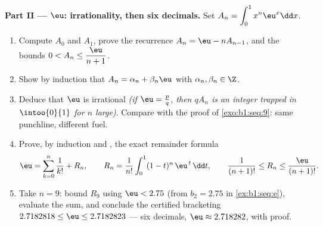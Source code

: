 \begin{problem}
\medskip
\noindent\textbf{Part II --- $\eu$: irrationality, then six
decimals.} Set $A_n = \displaystyle\int_0^1 x^n \eu^x \dd x$.
\begin{enumerate}[resume]
  \item Compute $A_0$ and $A_1$, prove the recurrence $A_n = \eu
        - n A_{n-1}$, and the bounds $0 < A_n \leq
        \dfrac{\eu}{n+1}$.
  \item Show by induction that $A_n = \alpha_n + \beta_n \eu$
        with $\alpha_n, \beta_n \in \Z$.
  \item Deduce that $\eu$ is irrational \emph{(if $\eu = \frac
        pq$, then $q A_n$ is an integer trapped in
        $\intoo{0}{1}$ for $n$ large)}. Compare with the proof
        of \cref{exo:b1:seq:9}: same punchline, different fuel.
  \item Prove, by induction and , the exact
        remainder formula
        \[
        \eu = \sum_{k=0}^{n} \frac{1}{k!} + R_n,
        \qquad
        R_n = \frac{1}{n!}\int_0^1 (1 - t)^n\,\eu^{\,t}\,\dd t,
        \qquad
        \frac{1}{(n+1)!} \leq R_n \leq \frac{\eu}{(n+1)!} .
        \]
  \item Take $n = 9$: bound $R_9$ using $\eu < 2.75$ (from
        $b_2 = 2.75$ in \cref{ex:b1:seq:e}), evaluate the sum,
        and conclude the certified bracketing $2.7182818 \leq
        \eu \leq 2.7182823$ --- six decimals, $\eu \approx
        2.718282$, with proof.
\end{enumerate}


\end{problem}
